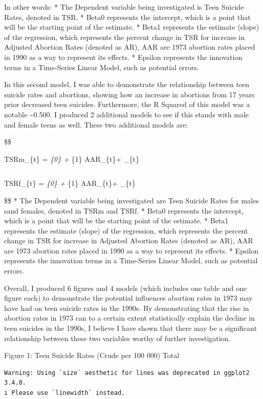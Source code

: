 \documentclass[
  letterpaper,
  DIV=11,
  numbers=noendperiod]{scrartcl}
\begin{document}
In other words: * The Dependent variable being investigated is Teen
Suicide Rates, denoted in TSR. * Beta0 represents the intercept, which
is a point that will be the starting point of the estimate. * Beta1
represents the estimate (slope) of the regression, which represents the
percent change in TSR for increase in Adjusted Abortion Rates (denoted
as AR), AAR are 1973 abortion rates placed in 1990 as a way to represent
its effects. * Epsilon represents the innovation terms in a Time-Series
Linear Model, such as potential errors.

In this second model, I was able to demonstrate the relationship between
teen suicide rates and abortions, showing how an increase in abortions
from 17 years prior decreased teen suicides. Furthermore, the R Squared
of this model was a notable \textasciitilde0.500. I produced 2
additional models to see if this stands with male and female teens as
well. These two additional models are:

\$\$

TSRm\_\{t\} = \beta\emph{\{0\} + \beta}\{1\} AAR\_\{t\}+ \epsilon\_\{t\}

\[
\]

TSRf\_\{t\} = \beta\emph{\{0\} + \beta}\{1\} AAR\_\{t\}+ \epsilon\_\{t\}

\$\$ * The Dependent variable being investigated are Teen Suicide Rates
for males sand females, denoted in TSRm and TSRf. * Beta0 represents the
intercept, which is a point that will be the starting point of the
estimate. * Beta1 represents the estimate (slope) of the regression,
which represents the percent change in TSR for increase in Adjusted
Abortion Rates (denoted as AR), AAR are 1973 abortion rates placed in
1990 as a way to represent its effects. * Epsilon represents the
innovation terms in a Time-Series Linear Model, such as potential
errors.

Overall, I produced 6 figures and 4 models (which includes one table and
one figure each) to demonstrate the potential influences abortion rates
in 1973 may have had on teen suicide rates in the 1990s. By
demonstrating that the rise in abortion rates in 1973 can to a certain
extent statistically explain the decline in teen suicides in the 1990s,
I believe I have shown that there may be a significant relationship
between these two variables worthy of further investigation.

Figure 1: Teen Suicide Rates (Crude per 100 000) Total

\begin{verbatim}
Warning: Using `size` aesthetic for lines was deprecated in ggplot2 3.4.0.
i Please use `linewidth` instead.
\end{verbatim}
\end{document}
